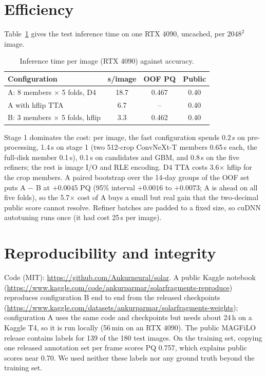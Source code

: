 \section{Efficiency}
Table~\ref{tab:speed} gives the test inference time on one RTX 4090, uncached, per $2048^2$ image.
\begin{table}[t]
\caption{Inference time per image (RTX 4090) against accuracy.}
\label{tab:speed}
\small
\begin{tabular}{lccc}
\toprule
Configuration & s/image & OOF PQ & Public \\
\midrule
A: 8 members $\times$ 5 folds, D4 & 18.7 & 0.467 & 0.40 \\
A with hflip TTA & 6.7 & -- & 0.40 \\
B: 3 members $\times$ 5 folds, hflip & 3.3 & 0.462 & 0.40 \\
\bottomrule
\end{tabular}
\end{table}
Stage 1 dominates the cost: per image, the fast configuration spends 0.2\,s on pre-processing, 1.4\,s on
stage 1 (two 512-crop ConvNeXt-T members 0.65\,s each, the full-disk member 0.1\,s), 0.1\,s on candidates and
GBM, and 0.8\,s on the five refiners; the rest is image I/O and RLE encoding. D4 TTA costs 3.6$\times$ hflip
for the crop members. A paired bootstrap over the 14-day groups of the OOF set puts A $-$ B at
$+0.0045$ PQ (95\% interval $+0.0016$ to $+0.0073$; A is ahead on all five folds), so the 5.7$\times$
cost of A buys a small but real gain that the two-decimal public score cannot resolve. Refiner batches are padded to a fixed size, so cuDNN autotuning runs once (it had cost
25\,s per image).

\section{Reproducibility and integrity}
Code (MIT): \url{https://github.com/Ankurneural/solar}. A public Kaggle notebook
(\url{https://www.kaggle.com/code/ankurparmar/solarfragments-reproduce}) reproduces configuration B end to end from the
released checkpoints (\url{https://www.kaggle.com/datasets/ankurparmar/solarfragments-weights}); configuration A uses the
same code and checkpoints but needs about 24\,h on a Kaggle T4, so it is run locally (56\,min on an RTX 4090).
The public MAGFiLO release contains labels for 139 of the 180 test images. On the training set, copying
one released annotation set per frame scores PQ 0.757, which explains public scores near 0.70.
We used neither these labels nor any ground truth beyond the training set.
